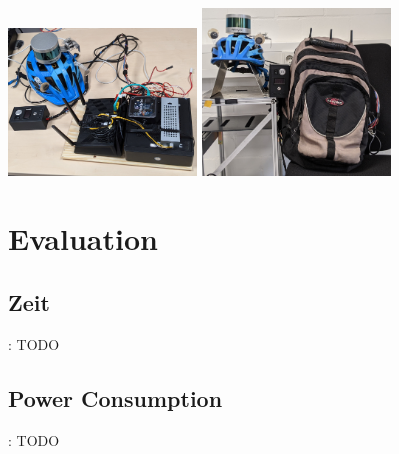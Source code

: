 \documentclass{beamer}
\begin{document}
\begin{frame}{\secname}
\begin{textblock*}{5cm}
\includegraphics[width=5cm]{images/Rucksack02.jpg}
\includegraphics[width=5cm]{images/Rucksack01.jpg}
\end{textblock*}
\end{frame}

\section{Evaluation}
\subsection{Zeit}
\begin{frame}{\secname: \subsecname}
TODO
\end{frame}

\subsection{Power Consumption}
\begin{frame}{\secname: \subsecname}
TODO
\end{frame}
\end{document}
